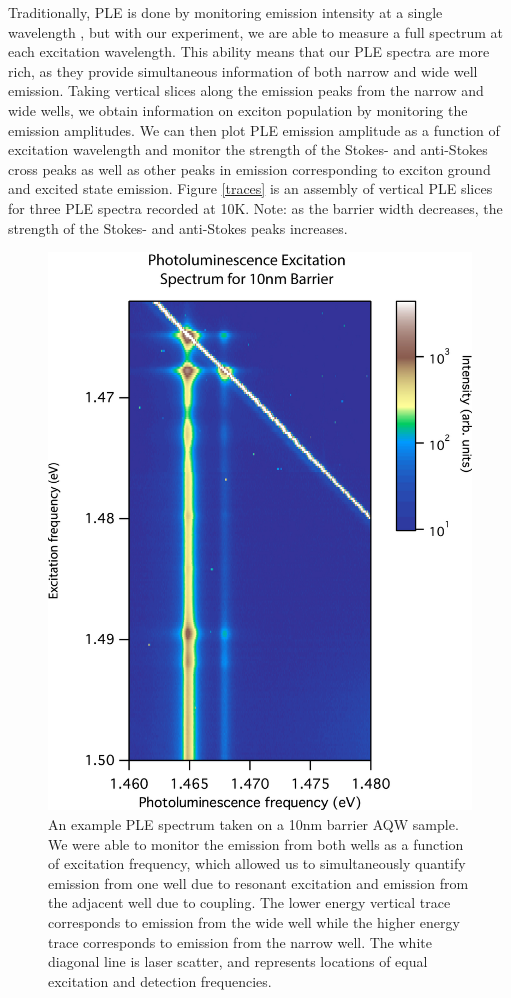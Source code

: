 \indent Traditionally, PLE is done by monitoring emission intensity at a single wavelength \cite{borri}, but with our experiment, we are able to measure a full spectrum at each excitation wavelength. This ability means that our PLE spectra are more rich, as they provide simultaneous information of both narrow and wide well emission. Taking vertical slices along the emission peaks from the narrow and wide wells, we obtain information on exciton population by monitoring the emission amplitudes. We can then plot PLE emission amplitude as a function of excitation wavelength and monitor the strength of the Stokes- and anti-Stokes cross peaks as well as other peaks in emission corresponding to exciton ground and excited state emission. Figure \ref{traces} is an assembly of vertical PLE slices for three PLE spectra recorded at 10K. Note: as the barrier width decreases, the strength of the Stokes- and anti-Stokes peaks increases. 

\newpage

\begin{figure}[!h]
\centering
\includegraphics[width = .7\textwidth]{Layout5.jpg}
\caption{ \doublespacing An example PLE spectrum taken on a 10nm barrier AQW sample. We were able to monitor the emission from both wells as a function of excitation frequency, which allowed us to simultaneously quantify emission from one well due to resonant excitation and emission from the adjacent well due to coupling. The lower energy vertical trace corresponds to emission from the wide well while the higher energy trace corresponds to emission from the narrow well. The white diagonal line is laser scatter, and represents locations of equal excitation and detection frequencies.}
\label{scan}
\end{figure}

